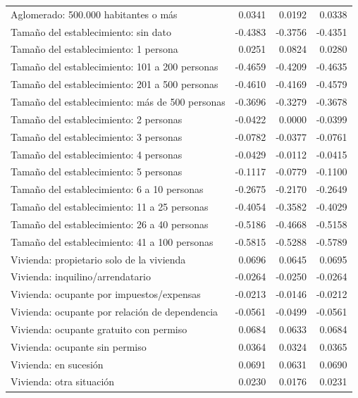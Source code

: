 \begin{longtable}{p{7cm}rrr}
Aglomerado: 500.000 habitantes o más & 0.0341 & 0.0192 & 0.0338 \\
Tamaño del establecimiento: sin dato & -0.4383 & -0.3756 & -0.4351 \\
Tamaño del establecimiento: 1 persona & 0.0251 & 0.0824 & 0.0280 \\
Tamaño del establecimiento: 101 a 200 personas & -0.4659 & -0.4209 & -0.4635 \\
Tamaño del establecimiento: 201 a 500 personas & -0.4610 & -0.4169 & -0.4579 \\
Tamaño del establecimiento: más de 500 personas & -0.3696 & -0.3279 & -0.3678 \\
Tamaño del establecimiento: 2 personas & -0.0422 & 0.0000 & -0.0399 \\
Tamaño del establecimiento: 3 personas & -0.0782 & -0.0377 & -0.0761 \\
Tamaño del establecimiento: 4 personas & -0.0429 & -0.0112 & -0.0415 \\
Tamaño del establecimiento: 5 personas & -0.1117 & -0.0779 & -0.1100 \\
Tamaño del establecimiento: 6 a 10 personas & -0.2675 & -0.2170 & -0.2649 \\
Tamaño del establecimiento: 11 a 25 personas & -0.4054 & -0.3582 & -0.4029 \\
Tamaño del establecimiento: 26 a 40 personas & -0.5186 & -0.4668 & -0.5158 \\
Tamaño del establecimiento: 41 a 100 personas & -0.5815 & -0.5288 & -0.5789 \\
Vivienda: propietario solo de la vivienda & 0.0696 & 0.0645 & 0.0695 \\
Vivienda: inquilino/arrendatario & -0.0264 & -0.0250 & -0.0264 \\
Vivienda: ocupante por impuestos/expensas & -0.0213 & -0.0146 & -0.0212 \\
Vivienda: ocupante por relación de dependencia & -0.0561 & -0.0499 & -0.0561 \\
Vivienda: ocupante gratuito con permiso & 0.0684 & 0.0633 & 0.0684 \\
Vivienda: ocupante sin permiso & 0.0364 & 0.0324 & 0.0365 \\
Vivienda: en sucesión & 0.0691 & 0.0631 & 0.0690 \\
Vivienda: otra situación & 0.0230 & 0.0176 & 0.0231 \\
\end{longtable}
